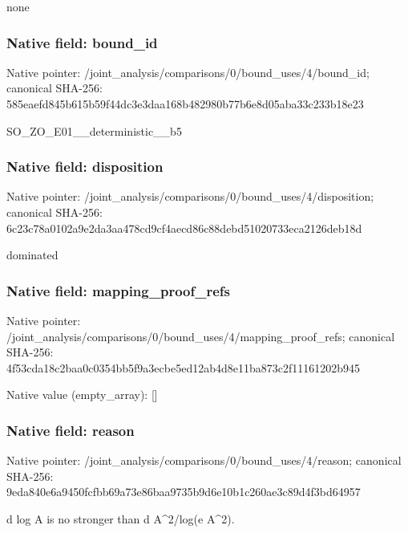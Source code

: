 \documentclass[10pt,a4paper]{article}
\begin{document}
\begingroup\raggedright\sloppy none\par\endgroup

\subsubsection{Native field: bound\_\allowbreak{}id}
Native pointer: /joint\_\allowbreak{}analysis/comparisons/0/bound\_\allowbreak{}uses/4/bound\_\allowbreak{}id; canonical SHA-256: 585eaefd845b615b59f44dc3e3daa168b482980b77b6e8d05aba33c233b18e23

\begingroup\raggedright\sloppy SO\_\allowbreak{}ZO\_\allowbreak{}E01\_\allowbreak{}\_\allowbreak{}deterministic\_\allowbreak{}\_\allowbreak{}b5\par\endgroup

\subsubsection{Native field: disposition}
Native pointer: /joint\_\allowbreak{}analysis/comparisons/0/bound\_\allowbreak{}uses/4/disposition; canonical SHA-256: 6c23c78a0102a9e2da3aa478cd9cf4aecd86c88debd51020733eca2126deb18d

\begingroup\raggedright\sloppy dominated\par\endgroup

\subsubsection{Native field: mapping\_\allowbreak{}proof\_\allowbreak{}refs}
Native pointer: /joint\_\allowbreak{}analysis/comparisons/0/bound\_\allowbreak{}uses/4/mapping\_\allowbreak{}proof\_\allowbreak{}refs; canonical SHA-256: 4f53cda18c2baa0c0354bb5f9a3ecbe5ed12ab4d8e11ba873c2f11161202b945

Native value (empty\_\allowbreak{}array): []

\subsubsection{Native field: reason}
Native pointer: /joint\_\allowbreak{}analysis/comparisons/0/bound\_\allowbreak{}uses/4/reason; canonical SHA-256: 9eda840e6a9450fcfbb69a73e86baa9735b9d6e10b1c260ae3c89d4f3bd64957

\begingroup\raggedright\sloppy d log A is no stronger than d A\textasciicircum{}2/\allowbreak{}log(e A\textasciicircum{}2).\par\endgroup
\end{document}
